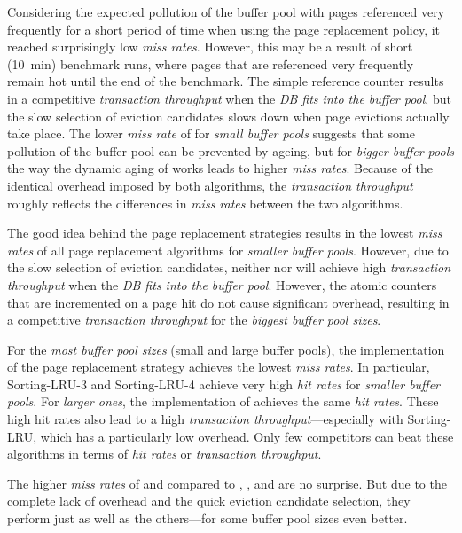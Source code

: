     Considering the expected pollution of the buffer pool with pages referenced very frequently for a short period of time when using the  page replacement policy, it reached surprisingly low \emph{miss rates}. However, this may be a result of short (\SI{10}{\minute}) benchmark runs, where pages that are referenced very frequently remain hot until the end of the benchmark. The simple reference counter results in a competitive \emph{transaction throughput} when the \emph{DB fits into the buffer pool}, but the slow selection of eviction candidates slows down  when page evictions actually take place. The lower \emph{miss rate} of  for \emph{small buffer pools} suggests that some pollution of the buffer pool can be prevented by ageing, but for \emph{bigger buffer pools} the way the dynamic aging of  works leads to higher \emph{miss rates}. Because of the identical overhead imposed by both algorithms, the \emph{transaction throughput} roughly reflects the differences in \emph{miss rates} between the two algorithms.

    The good idea behind the  page replacement strategies results in the lowest \emph{miss rates} of all page replacement algorithms for \emph{smaller buffer pools}. However, due to the slow selection of eviction candidates, neither  nor  will achieve high \emph{transaction throughput} when the \emph{DB fits into the buffer pool}. However, the atomic counters that are incremented on a page hit do not cause significant overhead, resulting in a competitive \emph{transaction throughput} for the \emph{biggest buffer pool sizes}.

    For the \emph{most buffer pool sizes} (small and large buffer pools), the  implementation of the  page replacement strategy achieves the lowest \emph{miss rates}. In particular, Sorting-LRU-3 and Sorting-LRU-4 achieve very high \emph{hit rates} for \emph{smaller buffer pools}. For \emph{larger ones}, the  implementation of  achieves the same \emph{hit rates}. These high hit rates also lead to a high \emph{transaction throughput}---especially with Sorting-LRU, which has a particularly low overhead. Only few competitors can beat these algorithms in terms of \emph{hit rates} or \emph{transaction throughput}.

    The higher \emph{miss rates} of  and  compared to , ,  and  are no surprise. But due to the complete lack of overhead and the quick eviction candidate selection, they perform just as well as the others---for some buffer pool sizes even better.

